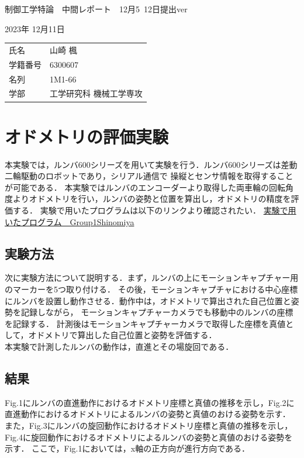 \documentclass[a4paper,11pt]{jsarticle}
\begin{document}
\begin{titlepage}
%
\vspace*{-100pt}\noindent 
{\Large 制御工学特論　中間レポート　12月5~12日提出ver}\vspace{5pt} \par
2023年 12月11日   \vspace{5pt} \par
%
\begin{tabular}{@{}ll}
氏名  & 山崎 楓        \\
学籍番号 & 6300607\\
名列 & 1M1-66\\
学部  & 工学研究科 機械工学専攻
\end{tabular}
%
\end{titlepage}

\section{オドメトリの評価実験}
本実験では，ルンバ600シリーズを用いて実験を行う．ルンバ600シリーズは差動二輪駆動のロボットであり，シリアル通信で
操縦とセンサ情報を取得することが可能である．
本実験ではルンバのエンコーダーより取得した両車輪の回転角度よりオドメトリを行い，ルンバの姿勢と位置を算出し，オドメトリの精度を評価する．
実験で用いたプログラムは以下のリンクより確認されたい．
\href{https://github.com/KIT-Robot2023/Roomba2023/tree/group1_shinomiya}{実験で用いたプログラム　Group1Shinomiya}

\subsection{実験方法}
次に実験方法について説明する．まず，ルンバの上にモーションキャプチャー用のマーカーを5つ取り付ける．
その後，モーションキャプチャにおける中心座標にルンバを設置し動作させる．動作中は，オドメトリで算出された自己位置と姿勢を記録しながら，
モーションキャプチャーカメラでも移動中のルンバの座標を記録する．
計測後はモーションキャプチャーカメラで取得した座標を真値として，オドメトリで算出した自己位置と姿勢を評価する．\\
本実験で計測したルンバの動作は，直進とその場旋回である．


\subsection{結果}
Fig.1にルンバの直進動作におけるオドメトリ座標と真値の推移を示し，Fig.2に直進動作におけるオドメトリによるルンバの姿勢と真値のおける姿勢を示す．
また，Fig.3にルンバの旋回動作におけるオドメトリ座標と真値の推移を示し，Fig.4に旋回動作におけるオドメトリによるルンバの姿勢と真値のおける姿勢を示す．
ここで，Fig.1においては，x軸の正方向が進行方向である．
\end{document}
